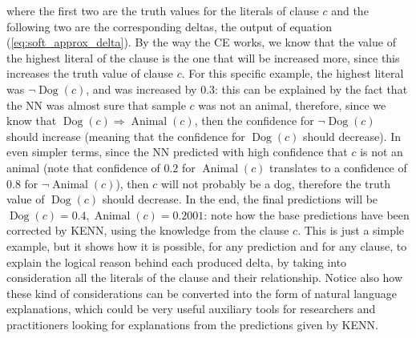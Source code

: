   where the first two are the truth values for the literals of clause $c$ and the following two are the corresponding deltas, the output of equation (\ref{eq:soft_approx_delta}). By the way the CE works, we know that the value of the highest literal of the clause is the one that will be increased more, since this increases the truth value of clause $c$. For this specific example, the highest literal was $\neg \operatorname{Dog}(c)$, and was increased by $0.3$: this can be explained by the fact that the NN was almost sure that sample $c$ was not an animal, therefore, since we know that $\operatorname{Dog}(c) \Rightarrow \operatorname{Animal}(c)$, then the confidence for $\neg \operatorname{Dog}(c)$ should increase (meaning that the confidence for $\operatorname{Dog}(c)$ should decrease). In even simpler terms, since the NN predicted with high confidence that $c$ is not an animal (note that confidence of $0.2$ for $\operatorname{Animal}(c)$ translates to a confidence of $0.8$ for $\neg \operatorname{Animal}(c)$), then $c$ will not probably be a dog, therefore the truth value of $\operatorname{Dog}(c)$ should decrease. In the end, the final predictions will be $\operatorname{Dog}(c)=0.4, \operatorname{Animal}(c)=0.2001$: note how the base predictions have been corrected by KENN, using the knowledge from the clause $c$. This is just a simple example, but it shows how it is possible, for any prediction and for any clause, to explain the logical reason behind each produced delta, by taking into consideration all the literals of the clause and their relationship. Notice also how these kind of considerations can be converted into the form of natural language explanations, which could be very useful auxiliary tools for researchers and practitioners looking for explanations from the predictions given by KENN.

